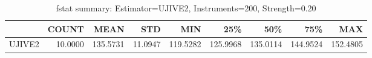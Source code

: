 \begin{table}[ht]
\centering
\caption{fstat summary: Estimator=UJIVE2, Instruments=200, Strength=0.20}
\begin{tabular}{lrrrrrrrr}
\toprule
 & COUNT & MEAN & STD & MIN & 25\% & 50\% & 75\% & MAX \\
\midrule
UJIVE2 & 10.0000 & 135.5731 & 11.0947 & 119.5282 & 125.9968 & 135.0114 & 144.9524 & 152.4805 \\
\bottomrule
\end{tabular}
\end{table}
